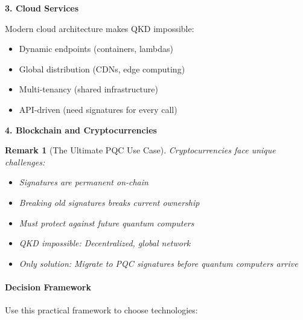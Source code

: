\documentclass[11pt,a4paper]{article}
\newtheorem{remark}{Remark}
\begin{document}
\textbf{3. Cloud Services}

Modern cloud architecture makes QKD impossible:
\begin{itemize}
    \item Dynamic endpoints (containers, lambdas)
    \item Global distribution (CDNs, edge computing)
    \item Multi-tenancy (shared infrastructure)
    \item API-driven (need signatures for every call)
\end{itemize}

\textbf{4. Blockchain and Cryptocurrencies}

\begin{remark}[The Ultimate PQC Use Case]
Cryptocurrencies face unique challenges:
\begin{itemize}
    \item Signatures are permanent on-chain
    \item Breaking old signatures breaks current ownership
    \item Must protect against future quantum computers
    \item QKD impossible: Decentralized, global network
    \item Only solution: Migrate to PQC signatures before quantum computers arrive
\end{itemize}
\end{remark}

\paragraph{Decision Framework}

Use this practical framework to choose technologies:
\end{document}
